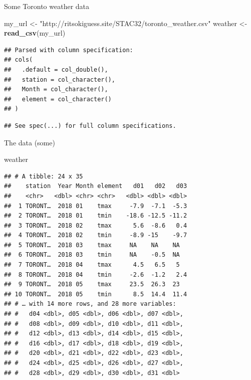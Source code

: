 \documentclass[ignorenonframetext,]{beamer}
\newenvironment{Shaded}{\begin{snugshade}}{\end{snugshade}}
\newcommand{\KeywordTok}[1]{\textcolor[rgb]{0.13,0.29,0.53}{\textbf{#1}}}
\newcommand{\NormalTok}[1]{#1}
\newcommand{\StringTok}[1]{\textcolor[rgb]{0.31,0.60,0.02}{#1}}
\begin{document}
\begin{frame}[fragile]{Some Toronto weather data}
\protect\hypertarget{some-toronto-weather-data}{}

\begin{Shaded}
\begin{Highlighting}[]
\NormalTok{my_url <-}\StringTok{ }
\StringTok{  "http://ritsokiguess.site/STAC32/toronto_weather.csv"}
\NormalTok{weather <-}\StringTok{ }\KeywordTok{read_csv}\NormalTok{(my_url)}
\end{Highlighting}
\end{Shaded}

\begin{verbatim}
## Parsed with column specification:
## cols(
##   .default = col_double(),
##   station = col_character(),
##   Month = col_character(),
##   element = col_character()
## )
\end{verbatim}

\begin{verbatim}
## See spec(...) for full column specifications.
\end{verbatim}

\end{frame}

\begin{frame}[fragile]{The data (some)}
\protect\hypertarget{the-data-some-2}{}

\begin{Shaded}
\begin{Highlighting}[]
\NormalTok{weather}
\end{Highlighting}
\end{Shaded}

\begin{verbatim}
## # A tibble: 24 x 35
##    station  Year Month element   d01   d02   d03
##    <chr>   <dbl> <chr> <chr>   <dbl> <dbl> <dbl>
##  1 TORONT…  2018 01    tmax     -7.9  -7.1  -5.3
##  2 TORONT…  2018 01    tmin    -18.6 -12.5 -11.2
##  3 TORONT…  2018 02    tmax      5.6  -8.6   0.4
##  4 TORONT…  2018 02    tmin     -8.9 -15    -9.7
##  5 TORONT…  2018 03    tmax     NA    NA    NA  
##  6 TORONT…  2018 03    tmin     NA    -0.5  NA  
##  7 TORONT…  2018 04    tmax      4.5   6.5   5  
##  8 TORONT…  2018 04    tmin     -2.6  -1.2   2.4
##  9 TORONT…  2018 05    tmax     23.5  26.3  23  
## 10 TORONT…  2018 05    tmin      8.5  14.4  11.4
## # … with 14 more rows, and 28 more variables:
## #   d04 <dbl>, d05 <dbl>, d06 <dbl>, d07 <dbl>,
## #   d08 <dbl>, d09 <dbl>, d10 <dbl>, d11 <dbl>,
## #   d12 <dbl>, d13 <dbl>, d14 <dbl>, d15 <dbl>,
## #   d16 <dbl>, d17 <dbl>, d18 <dbl>, d19 <dbl>,
## #   d20 <dbl>, d21 <dbl>, d22 <dbl>, d23 <dbl>,
## #   d24 <dbl>, d25 <dbl>, d26 <dbl>, d27 <dbl>,
## #   d28 <dbl>, d29 <dbl>, d30 <dbl>, d31 <dbl>
\end{verbatim}

\end{frame}
\end{document}
